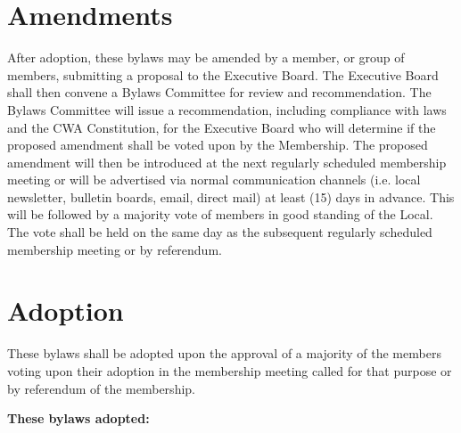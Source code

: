 \documentclass[11pt]{article}
\newcommand{\article}[1]{\vspace{.50cm}\section{#1}}
\begin{document}
\article{Amendments}\label{amendments}
After adoption, these bylaws may be amended by a member, or group of members, submitting a proposal to the Executive Board. The Executive Board shall then convene a Bylaws Committee for review and recommendation. The Bylaws Committee will issue a recommendation, including compliance with laws and the CWA Constitution, for the Executive Board who will determine if the proposed amendment shall be voted upon by the Membership. The proposed amendment will then be introduced at the next regularly scheduled membership meeting or will be advertised via normal communication channels (i.e. local newsletter, bulletin boards, email, direct mail) at least (15) days in advance. This will be followed by a majority vote of members in good standing of the Local. The vote shall be held on the same day as the subsequent regularly scheduled membership meeting or by referendum.

\article{Adoption}
These bylaws shall be adopted upon the approval of a majority of the members voting upon their adoption in the membership meeting called for that purpose or by referendum of the membership.

\vspace{1cm}
\large{\textbf{These bylaws adopted:}} %
\end{document}
